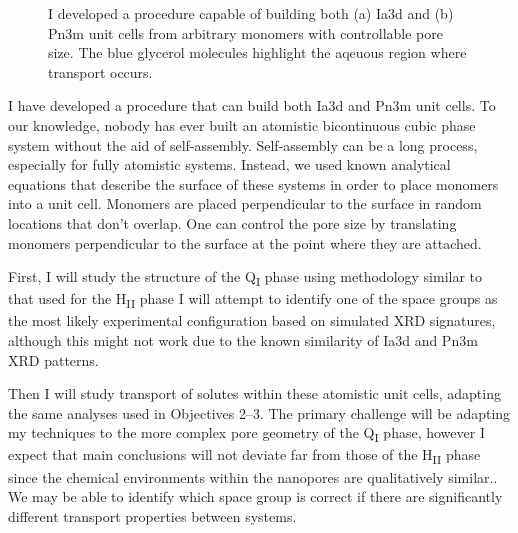 \documentclass{article}
\begin{document}
\begin{figure}
\begin{subfigure}{0.49\linewidth}
  \caption{}\label{fig:pn3m}
  \end{subfigure}
  \caption{I developed a procedure capable of building both (a) Ia3d and (b) Pn3m
  unit cells from arbitrary monomers with controllable pore size. The blue
  glycerol molecules highlight the aqeuous region where transport occurs.}\label{fig:q1_unitcells}
  \vspace{-0.5cm}
  \end{figure}
  
  I have developed a procedure that can build both Ia3d and Pn3m unit cells.
  To our knowledge, nobody has ever built an atomistic bicontinuous cubic 
  phase system without the aid of self-assembly. Self-assembly can be a long
  process, especially for fully atomistic systems. Instead, we used known
  analytical equations that describe the surface of these systems in order 
  to place monomers into a unit cell. Monomers are placed perpendicular to
  the surface in random locations that don't overlap. One can control the 
  pore size by translating monomers perpendicular to the surface at the 
  point where they are attached.
  
  First, I will study the structure of the Q\textsubscript{I} phase using
  methodology similar to that used for the H\textsubscript{II} phase 
  I will attempt to identify one of the space groups as the most likely
  experimental configuration based on simulated XRD signatures, although
  this might not work due to the known similarity of Ia3d and Pn3m XRD 
  patterns. %
  
  Then I will study transport of solutes within these atomistic unit cells, 
  adapting the same analyses used in Objectives 2--3. The primary 
  challenge will be adapting my techniques to the more complex pore geometry
  of the Q\textsubscript{I} phase, however I expect that main conclusions
  will not deviate far from those of the H\textsubscript{II} phase since
  the chemical environments within the nanopores are qualitatively similar.. We may be 
  able to identify which space group is correct if there are significantly
  different transport properties between systems.

  
%  
%  
\end{document}
